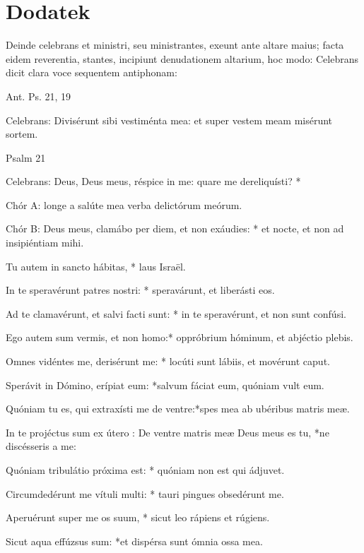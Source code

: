 \section{Dodatek}
\label{sec:dodatek}

 {\color{red} Deinde celebrans et ministri, seu ministrantes, exeunt ante altare maius;
  facta eidem reverentia, stantes, incipiunt denudationem altarium, hoc
  modo: Celebrans dicit clara voce sequentem antiphonam:}
\begin{center}
      {\color{red} Ant. Ps. 21, 19}
\end{center}
{\color{red} Celebrans:} Divisérunt sibi vestiménta mea: et super vestem meam misérunt
sortem.
\begin{center}
      {\color{red}Psalm 21}
\end{center}

{\color{red} Celebrans:} Deus, Deus meus, réspice in me: quare me dereliquísti? *

      {\color{red} Chór A:} longe a salúte mea verba delictórum meórum.

{\color{red} Chór B:} {\color{blue!70} Deus meus, clamábo per diem, et non exáudies: * et nocte,
et non ad insipiéntiam mihi.}

Tu autem in sancto hábitas, * laus Israël.

{\color{blue!70}In te speravérunt patres nostri: * speravárunt, et liberásti eos.}

Ad te clamavérunt, et salvi facti sunt: * in te speravérunt, et non sunt
confúsi.

{\color{blue!70}Ego autem sum vermis, et non homo:* oppróbrium hóminum, et abjéctio plebis.}

Omnes vidéntes me, derisérunt me: * locúti sunt lábiis, et movérunt caput.

{\color{blue!70}Sperávit in Dómino, erípiat eum: *salvum fáciat eum, quóniam vult eum.}

Quóniam tu es, qui extraxísti me de ventre:*spes mea ab ubéribus matris meæ.

{\color{blue!70}In te projéctus sum ex útero : De ventre matris meæ Deus meus es tu, *ne
discésseris a me:}

Quóniam tribulátio próxima est: * quóniam non est qui ádjuvet.

{\color{blue!70}Circumdedérunt me vítuli multi: * tauri pingues obsedérunt me.}

Aperuérunt super me os suum, * sicut leo rápiens et rúgiens.

{\color{blue!70}Sicut aqua effúzsus sum: *et dispérsa sunt ómnia ossa mea.}

